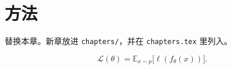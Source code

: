 \chapter{方法}
\label{ch:methods}

替换本章。新章放进 \texttt{chapters/}，并在 \texttt{chapters.tex} 里列入。

\begin{formulabox}
\[
  \mathcal{L}(\theta) = \mathbb{E}_{x\sim p}\bigl[\ell(f_\theta(x))\bigr].
\]
\end{formulabox}
